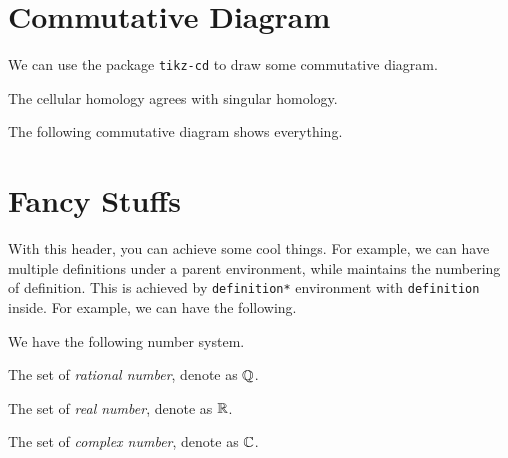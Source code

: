 \section{Commutative Diagram}
We can use the package \texttt{tikz-cd} to draw some commutative diagram.
\begin{eg}
	The cellular homology agrees with singular homology.
\end{eg}
\begin{explanation}
	The following commutative diagram shows everything.
	\par
\end{explanation}

\section{Fancy Stuffs}
With this header, you can achieve some cool things. For example, we can have multiple definitions under a parent environment, while maintains
the numbering of definition. This is achieved by \texttt{definition*} environment with \texttt{definition} inside. For example, we can have
the following.
\begin{definition*}
	We have the following number system.
	\begin{definition}\label{def:rational}
		The set of \emph{rational number}, denote as \(\mathbb{\MakeUppercase{q}} \).
	\end{definition}
	\begin{definition}\label{def:real}
		The set of \emph{real number}, denote as \(\mathbb{\MakeUppercase{r}} \).
	\end{definition}
	\begin{definition}\label{def:complex}
		The set of \emph{complex number}, denote as \(\mathbb{\MakeUppercase{c}} \).
	\end{definition}
\end{definition*}

